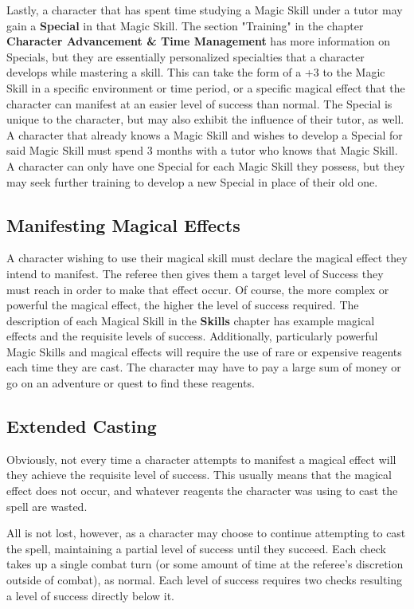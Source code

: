 \documentclass[oneside]{book}
\begin{document}
\begin{multicols}{2}
Lastly, a character that has spent time studying a Magic Skill under a tutor may gain a \textbf{Special} in that Magic Skill. The section "Training" in the chapter \textbf{Character Advancement \& Time Management} has more information on Specials, but they are essentially personalized specialties that a character develops while mastering a skill. This can take the form of a +3 to the Magic Skill in a specific environment or time period, or a specific magical effect that the character can manifest at an easier level of success than normal. The Special is unique to the character, but may also exhibit the influence of their tutor, as well. A character that already knows a Magic Skill and wishes to develop a Special for said Magic Skill must spend 3 months with a tutor who knows that Magic Skill. A character can only have one Special for each Magic Skill they possess, but they may seek further training to develop a new Special in place of their old one.

\subsection{Manifesting Magical Effects}
A character wishing to use their magical skill must declare the magical effect they intend to manifest. The referee then gives them a target level of Success they must reach in order to make that effect occur. Of course, the more complex or powerful the magical effect, the higher the level of success required. The description of each Magical Skill in the \textbf{Skills} chapter has example magical effects and the requisite levels of success. Additionally, particularly powerful Magic Skills and magical effects will require the use of rare or expensive reagents each time they are cast. The character may have to pay a large sum of money or go on an adventure or quest to find these reagents.

\subsection{Extended Casting}
Obviously, not every time a character attempts to manifest a magical effect will they achieve the requisite level of success. This usually means that the magical effect does not occur, and whatever reagents the character was using to cast the spell are wasted. 

All is not lost, however, as a character may choose to continue attempting to cast the spell, maintaining a partial level of success until they succeed. Each check takes up a single combat turn (or some amount of time at the referee's discretion outside of combat), as normal. Each level of success requires two checks resulting a level of success directly below it. 


\end{multicols}
\end{document}
